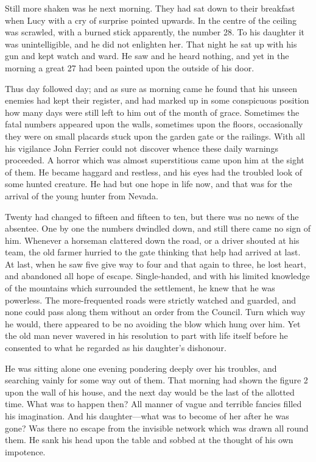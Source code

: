 \documentclass[12pt,english,oneside]{book}
\newcommand{\mdsh}[1]{\mbox{#1}\linebreak[1]}
\begin{document}
Still more shaken was he next morning. They had sat down to their
breakfast when Lucy with a cry of surprise pointed upwards. In the
centre of the ceiling was scrawled, with a burned stick apparently,
the number 28. To his daughter it was unintelligible, and he did not
enlighten her. That night he sat up with his gun and kept watch and
ward. He saw and he heard nothing, and yet in the morning a great
27 had been painted upon the outside of his door.

Thus day followed day; and as sure as morning came he found that his
unseen enemies had kept their register, and had marked up in some
conspicuous position how many days were still left to him out of the
month of grace. Sometimes the fatal numbers appeared upon the walls,
sometimes upon the floors, occasionally they were on small placards
stuck upon the garden gate or the railings. With all his vigilance
John Ferrier could not discover whence these daily warnings proceeded.
A horror which was almost superstitious came upon him at the sight
of them. He became haggard and restless, and his eyes had the troubled
look of some hunted creature. He had but one hope in life now, and
that was for the arrival of the young hunter from Nevada.

Twenty had changed to fifteen and fifteen to ten, but there was no
news of the absentee. One by one the numbers dwindled down, and still
there came no sign of him. Whenever a horseman clattered down the
road, or a driver shouted at his team, the old farmer hurried to the
gate thinking that help had arrived at last. At last, when he saw
five give way to four and that again to three, he lost heart, and
abandoned all hope of escape. Single-handed, and with his limited
knowledge of the mountains which surrounded the settlement, he knew
that he was powerless. The more-frequented roads were strictly watched
and guarded, and none could pass along them without an order from
the Council. Turn which way he would, there appeared to be no avoiding
the blow which hung over him. Yet the old man never wavered in his
resolution to part with life itself before he consented to what he
regarded as his daughter's dishonour.

He was sitting alone one evening pondering deeply over his troubles,
and searching vainly for some way out of them. That morning had shown
the figure 2 upon the wall of his house, and the next day would be
the last of the allotted time. What was to happen then? All manner
of vague and terrible fancies filled his imagination. And his daughter\mdsh{---}what
was to become of her after he was gone? Was there no escape from the
invisible network which was drawn all round them. He sank his head
upon the table and sobbed at the thought of his own impotence.
\end{document}
